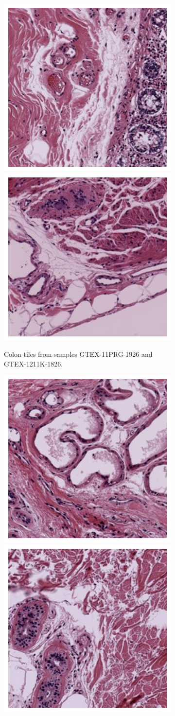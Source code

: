 \documentclass{l4proj}
\begin{document}
\begin{appendices}
\begin{figure}
\end{figure}
\begin{figure}\ContinuedFloat
    \begin{subfigure}[b]{\textwidth}
        \includegraphics[width=0.45\linewidth]{images/colon1_1s.png}
        \includegraphics[width=0.45\linewidth]{images/colon2_1s.png}
        \caption{Colon tiles from samples GTEX-11PRG-1926 and GTEX-1211K-1826.}
        \label{fig:leiden1_colon}
        \vspace{1in}
    \end{subfigure}
    \begin{subfigure}[b]{\textwidth}
        \includegraphics[width=0.45\linewidth]{images/skin1_1s.png}
        \includegraphics[width=0.45\linewidth]{images/skin2_1s.png}

\end{subfigure}
\end{figure}
\end{appendices}
\end{document}
